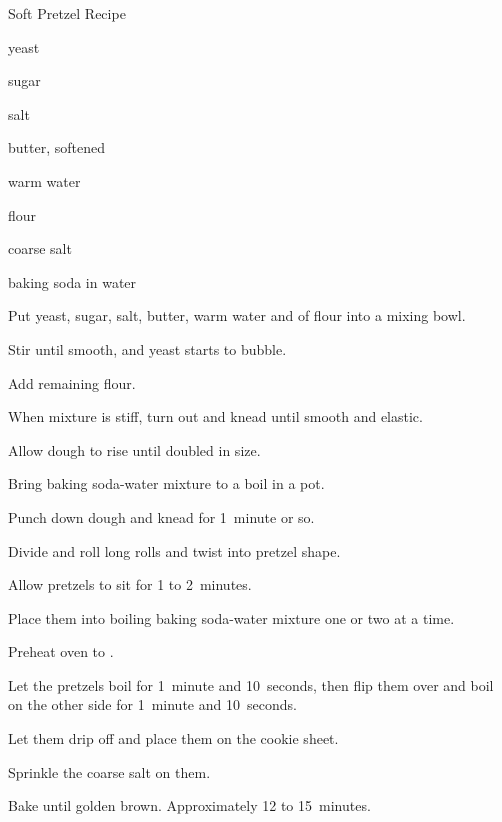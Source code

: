 \begin{recipe}{Soft Pretzel Recipe\UNTESTED}{}{}

\begin{ingredients}
\item {} yeast
\item {} sugar
\item {} salt
\item {} butter, softened
\item {} warm water
\item \C{2\threequarter} flour
\item coarse salt
\item {} baking soda in  water
\end{ingredients}

\begin{directions}
\item Put yeast, sugar, salt, butter, warm water and  of flour into a mixing bowl.
\item Stir until smooth, and yeast starts to bubble.
\item Add remaining flour.
\item When mixture is stiff, turn out and knead until smooth and elastic.
\item Allow dough to rise until doubled in size.
\item Bring baking soda-water mixture to a boil in a pot.
\item Punch down dough and knead for 1~minute or so.
\item Divide and roll  long rolls and twist into pretzel shape.
\item Allow pretzels to sit for 1 to 2~minutes.
\item Place them into boiling baking soda-water mixture one or two at a time.
\item Preheat oven to .
\item Let the pretzels boil for 1~minute and 10~seconds, then flip them over and boil on the other side for 1~minute and 10~seconds.
\item Let them drip off and place them on the cookie sheet.
\item Sprinkle the coarse salt on them.
\item Bake until golden brown. Approximately 12 to 15~minutes.
\end{directions}
\end{recipe}
